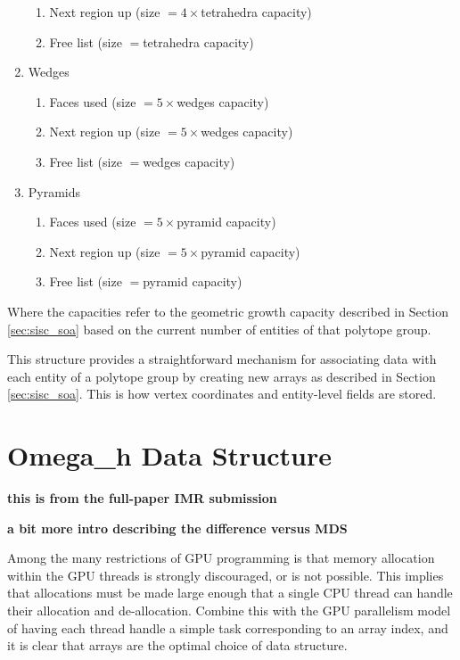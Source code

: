 \begin{enumerate}
\begin{enumerate}
  \item Next region up (size $=4\times$tetrahedra capacity)
  \item Free list (size $=$tetrahedra capacity)
  \end{enumerate}
\item Wedges
  \begin{enumerate}
  \item Faces used (size $=5\times$wedges capacity)
  \item Next region up (size $=5\times$wedges capacity)
  \item Free list (size $=$wedges capacity)
  \end{enumerate}
\item Pyramids
  \begin{enumerate}
  \item Faces used (size $=5\times$pyramid capacity)
  \item Next region up (size $=5\times$pyramid capacity)
  \item Free list (size $=$pyramid capacity)
  \end{enumerate}
\end{enumerate}
Where the capacities refer to the geometric growth
capacity described in Section \ref{sec:sisc_soa} based
on the current number of entities of that polytope group.

This structure provides a straightforward mechanism for associating
data with each entity of a polytope group by creating
new arrays as described in Section \ref{sec:sisc_soa}.
This is how vertex coordinates and entity-level fields
are stored.

\section{Omega\_h Data Structure}
\label{sec:omega_h-struct}

{\bf this is from the full-paper IMR submission}

{\bf a bit more intro describing the difference
versus MDS}

Among the many restrictions of GPU programming
is that memory allocation within the GPU threads is strongly
discouraged, or is not possible.
This implies that allocations must be made large enough
that a single CPU thread can handle their allocation and de-allocation.
Combine this with the GPU parallelism model of having each
thread handle a simple task corresponding to an array index, and
it is clear that arrays are the optimal choice of data structure.


